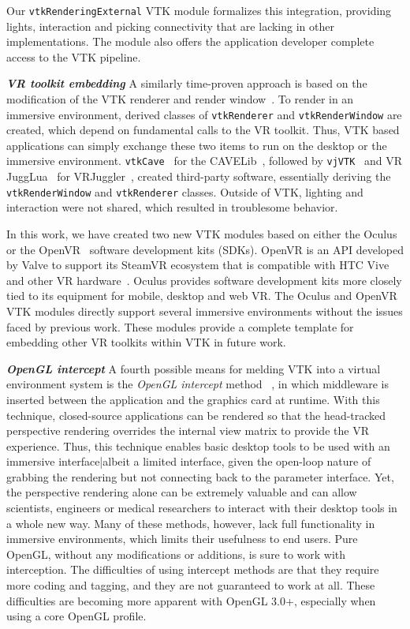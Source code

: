 Our \texttt{vtkRenderingExternal} VTK module formalizes this integration, providing lights, interaction and picking connectivity that are lacking in other implementations. The module also offers the application developer complete access to the VTK pipeline.

\textbf{\textit{VR toolkit embedding}} A similarly time-proven approach is based on the modification of the VTK renderer and render window~\cite{van2000vista, Hannema:2001, Shamonin02vtkcave, Belleman:2003}. 
To render in an immersive environment, derived classes of
\texttt{vtkRenderer} and \texttt{vtkRenderWindow} are created, which depend on fundamental calls to the VR toolkit.
Thus, VTK based applications can simply exchange these two items to run on the desktop or the immersive environment.
\texttt{vtkCave}~\cite{Tufo:1999} for the CAVELib~\cite{CAVELib:2016}, followed by
\texttt{vjVTK}~\cite{Blom:2006} and VR JuggLua~\cite{Pavlik:2012} for
VRJuggler~\cite{Bierbaum:2001}, created third-party software, essentially
deriving the \texttt{vtkRenderWindow} and \texttt{vtkRenderer} classes. Outside of VTK, lighting and interaction were not shared, which resulted in troublesome behavior.

In this work, we have created two new VTK modules based on either the Oculus~\cite{Oculus:2016} or the OpenVR~\cite{OpenVR:2016} software development kits (SDKs).
OpenVR is an API developed by Valve to support its SteamVR ecosystem that is compatible with HTC Vive and other VR hardware~\cite{Road2VR:2015}. Oculus provides software development kits more closely tied to its equipment for mobile, desktop and web VR. The Oculus and OpenVR VTK modules directly support several immersive environments
without the issues faced by previous work. These modules provide a complete template
for embedding other VR toolkits within VTK in future work.

\textit{\textbf{OpenGL intercept}}
A fourth possible means for melding VTK into a virtual environment system
is the \textit{OpenGL intercept} method
~\cite{Humphreys:2001,Humphreys:2002,Zielinski:2014,TechViz:2016,Conduit:2016}, in which middleware is inserted between the application and the graphics card at runtime.
With this technique, closed-source applications can be rendered so that
the head-tracked perspective rendering overrides the internal view matrix
to provide the VR experience.
Thus, this technique enables basic desktop tools to be used with an
immersive interface|albeit a limited interface, given the open-loop nature of
grabbing the rendering but not connecting back to the parameter interface.
Yet, the perspective rendering alone can be extremely valuable and can allow
scientists, engineers or medical researchers to interact with their desktop
tools in a whole new way. Many of these methods, however, lack full functionality in immersive environments, which limits their usefulness to end users.
Pure OpenGL, without any modifications or additions, is sure to work with interception.
The difficulties of using intercept methods are that they require more coding
and tagging, and they are not guaranteed to work at all. These difficulties are becoming
more apparent with OpenGL 3.0+, especially when using a core OpenGL profile.

